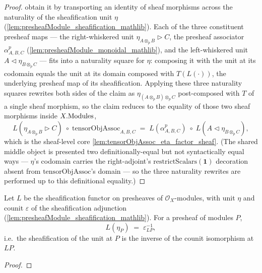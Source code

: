 \begin{proof}
  \leanok
  obtain it by transporting an identity of sheaf morphisms across the naturality of
  the sheafification unit \(\eta\) (\cref{lem:presheafModule_sheafification_mathlib}).
  Each of the three constituent presheaf maps --- the right-whiskered unit
  \(\eta_{A \otimes_{p} B} \rhd C\), the presheaf associator \(\alpha^{p}_{A,B,C}\)
  (\cref{lem:presheafModule_monoidal_mathlib}), and the left-whiskered unit
  \(A \lhd \eta_{B \otimes_{p} C}\) --- fits into a naturality square for \(\eta\):
  composing it with the unit at its codomain equals the unit at its domain composed
  with \(T(L(\cdot))\), the underlying presheaf map of its sheafification. Applying
  these three naturality squares rewrites both sides of the claim as
  \(\eta_{(A \otimes_{p} B) \otimes_{p} C}\) post-composed with \(T\) of a single
  sheaf morphism, so the claim reduces to the equality of those two sheaf morphisms
  inside \(X.\mathrm{Modules}\),
  \[
    L(\eta_{A \otimes_{p} B} \rhd C) \;\circ\; \mathrm{tensorObjAssoc}_{A,B,C}
      \;=\; L(\alpha^{p}_{A,B,C}) \;\circ\; L(A \lhd \eta_{B \otimes_{p} C}),
  \]
  which is the sheaf-level core \cref{lem:tensorObjAssoc_eta_factor_sheaf}. (The
  shared middle object is presented two definitionally-equal but not syntactically
  equal ways --- \(\eta\)'s codomain carries the right-adjoint's
  \(\mathrm{restrictScalars}(\mathbf{1})\) decoration absent from
  \(\mathrm{tensorObjAssoc}\)'s domain --- so the three naturality rewrites are
  performed up to this definitional equality.)
\end{proof}

\begin{lemma}
  \label{lem:sheafification_map_unit_eq}
  Let \(L\) be the sheafification functor on presheaves of \(\mathcal{O}_X\)-modules,
  with unit \(\eta\) and counit \(\varepsilon\) of the sheafification adjunction
  (\cref{lem:presheafModule_sheafification_mathlib}). For a presheaf of modules
  \(P\),
  \[
    L(\eta_P) \;=\; \varepsilon_{L P}^{-1},
  \]
  i.e.\ the sheafification of the unit at \(P\) is the inverse of the counit
  isomorphism at \(LP\).
\end{lemma}

\begin{proof}\leanok\end{proof}

